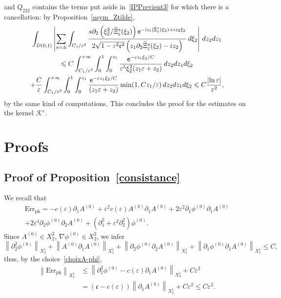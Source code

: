 \documentclass[10pt]{amsart}
\theoremstyle{definition}\newtheorem{defi}[theo]{Definition}\newtheorem{rema}[theo]{Remark}\newtheorem{exam}[theo]{Example}\newtheorem{exem}[theo]{Example}\newtheorem{nota}[theo]{Notation}
\newcommand*\p{\partial}
\newcommand{\phl}{\mathrm{ph}}
\newcommand{\Err}{\mathrm{Err}}
\newcommand*\BK{\mathcal{K}}
\newcommand*\ex{{\sf e}}
\newcommand*\cs{{\mathfrak c}}
\newcommand*\ii{\infty}
\newcommand*\ls{\leqslant }
\newcommand*\e{\varepsilon}
\renewcommand*\t{\tilde}
\let\oldtilde\tilde
\renewcommand*{\tilde}[1]{\mathchoice{\widetilde{#1}}{\widetilde{#1}}{\oldtilde{#1}}{\oldtilde{#1}}}
\begin{document}
and $ Q_{222} $ contains the terms put aside in~\eqref{IPPrevient3} for which there is a cancellation: by Proposition~\ref{asym_Ztilde},
\begin{multline*}
\int_{D(0,1)} \left\lvert \sum_{s =\pm } \int_{C_1/\e^2}
\frac{ s \p_2 \left(\xi_2^2 / \t\Xi_\e^s (\xi_2)\right) \ex^{- |z_1| \t\Xi_\e^s (\xi_2) + i z_2 \xi_2} }{ 2 \sqrt{ 1 - \e^2 \cs^2 } \left(z_1 \p_2 \t\Xi_\e^s (\xi_2) - i z_2\right) } \, d\xi_2 \right\rvert \, dz_2 dz_1
\\ 
\ls C \int_{ C_1 / \e^{2} }^{+\ii} \int_0^1 \int_0^{z_1}
\frac{ \ex^{- \e z_1 \xi_2 /C } }{ \e^5 \xi_2^2 (z_1 \e + z_2) } \, dz_2 dz_1 d\xi_2
\\+ \frac{C}{\e} \int_{ C_1 / \e^{2} }^{+\ii} \int_0^1 \int_0^{z_1}
\frac{ \ex^{- \e z_1 \xi_2 /C } }{ (z_1 \e + z_2) } \min (1, Cz_1 / \e) \, dz_2 dz_1 d\xi_2
\ls C \frac{ \lvert \ln \e \rvert }{ \e^2 },
\end{multline*}
by the same kind of computations. This concludes the proof for the estimates on the kernel $ \BK^\e $.



\section{Proofs}


\subsection{Proof of Proposition~\ref{consistance}}

We recall that
\begin{multline*}
\Err_{\phl}  = - c(\e) \p_{1} A^{(0)} + \e^2 c (\e) A^{(0)} \p_{1} A^{(0)} + 2 \e^2 \p_{1} \phi^{(0)} \p_{1} A^{(0)}
\\ + 2 \e^4 \p_{2} \phi^{(0)} \p_{2} A^{(0)} + \left(\p_{1}^2 + \e^2 \p^2_{2}\right) \phi^{(0)}.
\end{multline*}
Since $ A^{(0)} \in X^2_{2 } $, $ \nabla \phi^{(0)} \in X^2_{2 } $, we infer
\[
\left\| \p^2_{2} \phi^{(0)}\right\|_{ X^1_{3}} + \left\| A^{(0)} \p_{1} A^{(0)}\right\|_{ X^1_5 } + \left\| \p_{2} \phi^{(0)} \p_{2} A^{(0)}\right\|_{ X^1_5 } + \left\| \p_{1} \phi^{(0)} \p_{1} A^{(0)}\right\|_{ X^1_5 }
\ls C,
\]
thus, by the choice~\eqref{choixA-phi},
\begin{align*}
\left\| \Err_{\phl}\right\|_{ X^1_3 } & \ls \left\| \p_{1}^2 \phi^{(0)} - c(\e) \p_{1} A^{(0)} \right\|_{ X^1_3 } + C \e^2
\\ & = (\cs - c(\e)) \left\| \p_{1} A^{(0)}\right\|_{ X^1_3 } + C \e^2
\ls C \e^2.
\end{align*}
\end{document}
